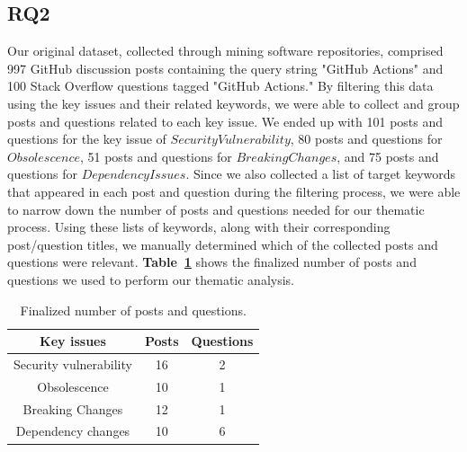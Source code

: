 \documentclass[conference]{IEEEtran}
\begin{document}
  \subsection{RQ2}
Our original dataset, collected through mining software repositories, comprised 997 GitHub discussion posts containing the query string "GitHub Actions" and 100 Stack Overflow questions tagged "GitHub Actions." By filtering this data using the key issues and their related keywords, we were able to collect and group posts and questions related to each key issue. We ended up with 101 posts and questions for the key issue of $Security Vulnerability$, 80 posts and questions for $Obsolescence$, 51 posts and questions for $Breaking Changes$, and 75 posts and questions for $Dependency Issues$. Since we also collected a list of target keywords that appeared in each post and question during the filtering process, we were able to narrow down the number of posts and questions needed for our thematic process. Using these lists of keywords, along with their corresponding post/question titles, we manually determined which of the collected posts and questions were relevant. \textbf{Table~\ref{tab:number_data}} shows the finalized number of posts and questions we used to perform our thematic analysis.
\begin{table}[H]
\centering
\caption{Finalized number of posts and questions.}
\label{tab:number_data}
\begin{tabular}{|c|c|c|}
  \hline
  \textbf{Key issues} & \textbf{Posts}  & \textbf{Questions} \\
  \hline
  \hline
    Security vulnerability & 16 &  2  \\
  \hline
   Obsolescence & 10  & 1 \\
  \hline
  \hline
   Breaking Changes & 12 & 1 \\
  \hline
  \hline
   Dependency changes & 10 & 6  \\
  \hline
\end{tabular}
\end{table}
\end{document}
